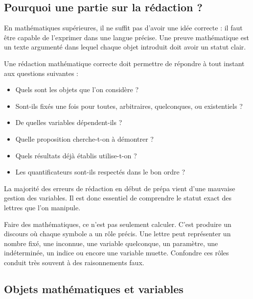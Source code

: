 \documentclass[11pt,a4paper]{article}
\begin{document}
\subsection{Pourquoi une partie sur la rédaction ?}

En mathématiques supérieures, il ne suffit pas d'avoir une idée correcte : il faut être capable de l'exprimer dans une langue précise. Une preuve mathématique est un texte argumenté dans lequel chaque objet introduit doit avoir un statut clair.

\begin{retenirbox}
Une rédaction mathématique correcte doit permettre de répondre à tout instant aux questions suivantes :
\begin{itemize}
    \item Quels sont les objets que l'on considère ?
    \item Sont-ils fixés une fois pour toutes, arbitraires, quelconques, ou existentiels ?
    \item De quelles variables dépendent-ils ?
    \item Quelle proposition cherche-t-on à démontrer ?
    \item Quels résultats déjà établis utilise-t-on ?
    \item Les quantificateurs sont-ils respectés dans le bon ordre ?
\end{itemize}
\end{retenirbox}

La majorité des erreurs de rédaction en début de prépa vient d'une mauvaise gestion des variables. Il est donc essentiel de comprendre le statut exact des lettres que l'on manipule.

\begin{remarquebox}
Faire des mathématiques, ce n'est pas seulement calculer. C'est produire un discours où chaque symbole a un rôle précis. Une lettre peut représenter un nombre fixé, une inconnue, une variable quelconque, un paramètre, une indéterminée, un indice ou encore une variable muette. Confondre ces rôles conduit très souvent à des raisonnements faux.
\end{remarquebox}

\subsection{Objets mathématiques et variables}
\end{document}
